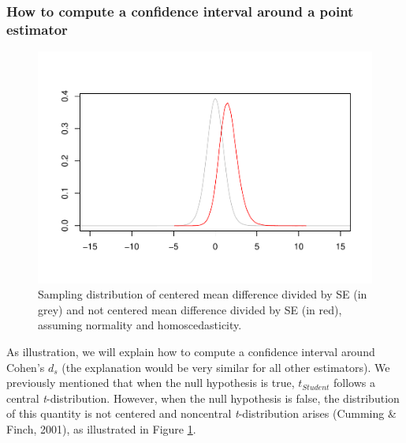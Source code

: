 \documentclass[
  english,
  man,floatsintext]{apa6}
\begin{document}
\hypertarget{how-to-compute-a-confidence-interval-around-a-point-estimator}{%
\subsubsection{How to compute a confidence interval around a point estimator}\label{how-to-compute-a-confidence-interval-around-a-point-estimator}}

\begin{figure}
\centering
\includegraphics{CI_files/figure-latex/SAMPLMEANDIFF3-1.pdf}
\caption{\label{fig:SAMPLMEANDIFF3}Sampling distribution of centered mean difference divided by SE (in grey) and not centered mean difference divided by SE (in red), assuming normality and homoscedasticity.}
\end{figure}

As illustration, we will explain how to compute a confidence interval around Cohen's \(d_s\) (the explanation would be very similar for all other estimators). We previously mentioned that when the null hypothesis is true, \(t_{Student}\) follows a central \emph{t}-distribution. However, when the null hypothesis is false, the distribution of this quantity is not centered and noncentral \emph{t}-distribution arises (Cumming \& Finch, 2001), as illustrated in Figure \ref{fig:SAMPLMEANDIFF3}.
\end{document}
